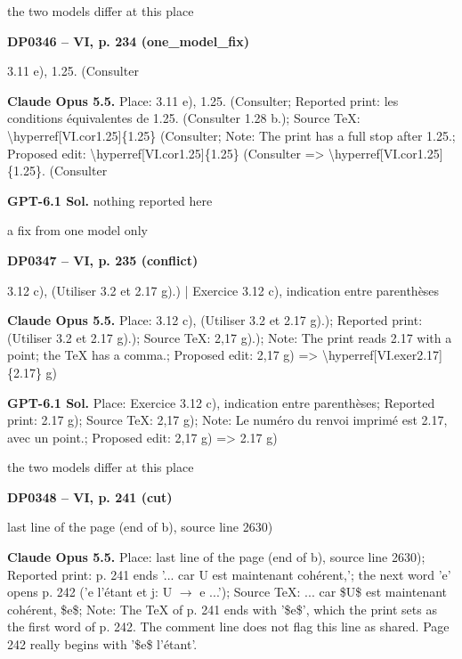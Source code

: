 the two models differ at this place\par
\par\noindent\hypertarget{DP0346}{}\textbf{DP0346 -- VI, p. 234 (one\_model\_fix)}\par
3.11 e), 1.25. (Consulter\par
\textbf{Claude Opus 5.5.} Place: 3.11 e), 1.25. (Consulter; Reported print: les conditions équivalentes de 1.25. (Consulter 1.28 b.); Source TeX: \textbackslash{}hyperref[VI.cor1.25]\{1.25\} (Consulter; Note: The print has a full stop after 1.25.; Proposed edit: \textbackslash{}hyperref[VI.cor1.25]\{1.25\} (Consulter =\allowbreak > \textbackslash{}hyperref[VI.cor1.25]\{1.25\}. (Consulter\par
\textbf{GPT-6.1 Sol.} nothing reported here\par
a fix from one model only\par
\par\noindent\hypertarget{DP0347}{}\textbf{DP0347 -- VI, p. 235 (conflict)}\par
3.12 c), (Utiliser 3.2 et 2.17 g).) | Exercice 3.12 c), indication entre parenthèses\par
\textbf{Claude Opus 5.5.} Place: 3.12 c), (Utiliser 3.2 et 2.17 g).); Reported print: (Utiliser 3.2 et 2.17 g).); Source TeX: 2,17 g).); Note: The print reads 2.17 with a point; the TeX has a comma.; Proposed edit: 2,17 g) =\allowbreak > \textbackslash{}hyperref[VI.exer2.17]\{2.17\} g)\par
\textbf{GPT-6.1 Sol.} Place: Exercice 3.12 c), indication entre parenthèses; Reported print: 2.17 g); Source TeX: 2,17 g); Note: Le numéro du renvoi imprimé est 2.17, avec un point.; Proposed edit: 2,17 g) =\allowbreak > 2.17 g)\par
the two models differ at this place\par
\par\noindent\hypertarget{DP0348}{}\textbf{DP0348 -- VI, p. 241 (cut)}\par
last line of the page (end of b), source line 2630)\par
\textbf{Claude Opus 5.5.} Place: last line of the page (end of b), source line 2630); Reported print: p. 241 ends '... car U est maintenant cohérent,'; the next word 'e' opens p. 242 ('e l'étant et j: U \ensuremath{\to} e ...'); Source TeX: ... car \$U\$ est maintenant cohérent, \$e\$; Note: The TeX of p. 241 ends with '\$e\$', which the print sets as the first word of p. 242. The comment line does not flag this line as shared. Page 242 really begins with '\$e\$ l'étant'.\par

